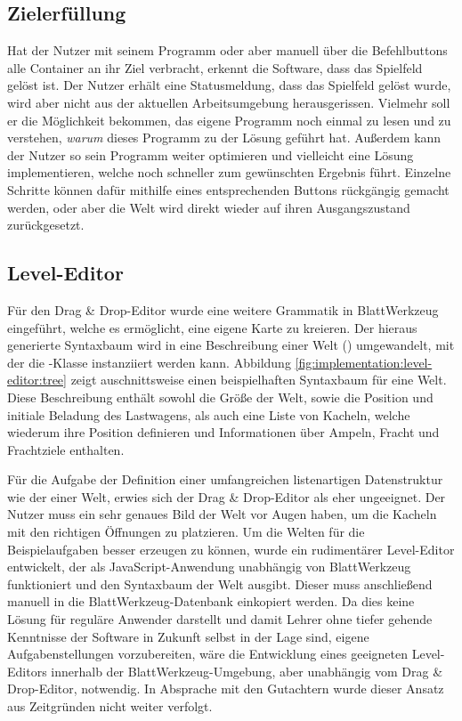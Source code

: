 \subsection{Zielerfüllung}
\label{sec:implementation:finish}

Hat der Nutzer mit seinem Programm oder aber manuell über die Befehlbuttons alle Container an ihr Ziel verbracht, erkennt die Software, dass das Spielfeld gelöst ist. Der Nutzer erhält eine Statusmeldung, dass das Spielfeld gelöst wurde, wird aber nicht aus der aktuellen Arbeitsumgebung herausgerissen. Vielmehr soll er die Möglichkeit bekommen, das eigene Programm noch einmal zu lesen und zu verstehen, \emph{warum} dieses Programm zu der Lösung geführt hat. Außerdem kann der Nutzer so sein Programm weiter optimieren und vielleicht eine Lösung implementieren, welche noch schneller zum gewünschten Ergebnis führt. Einzelne Schritte können dafür mithilfe eines entsprechenden Buttons rückgängig gemacht werden, oder aber die Welt wird direkt wieder auf ihren Ausgangszustand zurückgesetzt.

\subsection{Level-Editor}
\label{sec:implementation:level-editor}

Für den Drag \& Drop-Edi\-tor wurde eine weitere Grammatik in BlattWerkzeug eingeführt, welche es ermöglicht, eine eigene Karte zu kreieren. Der hieraus generierte Syntaxbaum wird in eine Beschreibung einer Welt () umgewandelt, mit der die -Klas\-se instanziiert werden kann. Abbildung \ref{fig:implementation:level-editor:tree} zeigt auschnittsweise einen beispielhaften Syntaxbaum für eine Welt. Diese Beschreibung enthält sowohl die Größe der Welt, sowie die Position und initiale Beladung des Lastwagens, als auch eine Liste von Kacheln, welche wiederum ihre Position definieren und Informationen über Ampeln, Fracht und Frachtziele enthalten.

Für die Aufgabe der Definition einer umfangreichen listenartigen Datenstruktur wie der einer Welt, erwies sich der Drag \& Drop-Edi\-tor als eher ungeeignet. Der Nutzer muss ein sehr genaues Bild der Welt vor Augen haben, um die Kacheln mit den richtigen Öffnungen zu platzieren. Um die Welten für die Beispielaufgaben besser erzeugen zu können, wurde ein rudimentärer Level-Edi\-tor entwickelt, der als JavaScript-Anwendung unabhängig von BlattWerkzeug funktioniert und den Syntaxbaum der Welt ausgibt. Dieser muss anschließend manuell in die Blatt\-Werk\-zeug-Da\-ten\-bank einkopiert werden. Da dies keine Lösung für reguläre Anwender darstellt und damit Lehrer ohne tiefer gehende Kenntnisse der Software in Zukunft selbst in der Lage sind, eigene Aufgabenstellungen vorzubereiten, wäre die Entwicklung eines geeigneten Level-Edi\-tors innerhalb der Blatt\-Werk\-zeug-Um\-ge\-bung, aber unabhängig vom Drag \& Drop-Edi\-tor, notwendig. In Absprache mit den Gutachtern wurde dieser Ansatz aus Zeitgründen nicht weiter verfolgt.

